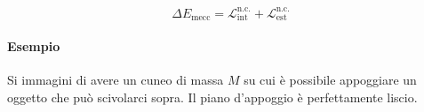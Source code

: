 \[
	\Delta E_\text{mecc}=\mathcal{L}^\text{n.c.}_\text{int}+\mathcal{L}^\text{n.c.}_\text{est}
\]

\paragraph{Esempio} Si immagini di avere un cuneo di massa $M$ su cui è possibile appoggiare un oggetto che può scivolarci sopra. Il piano d'appoggio è perfettamente liscio.

\begin{figure}[htpb]
	\centering


	\begin{tikzpicture}[x=0.75pt,y=0.75pt,yscale=-1,xscale=1]


\end{tikzpicture}
\end{figure}
